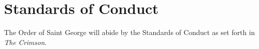 {
	\section{Standards of Conduct}
	The Order of Saint George will abide by the Standards of Conduct as set forth in \textit{The Crimson}.
}